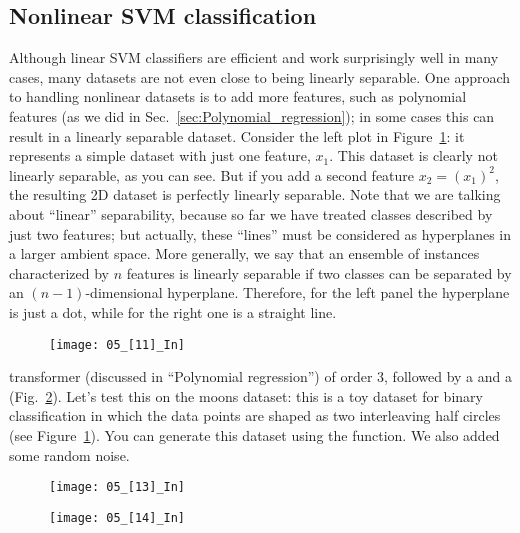 \subsection{Nonlinear SVM classification}
Although linear SVM classifiers are efficient and work surprisingly well in many cases, many datasets are not even close to being linearly separable. One approach to handling nonlinear datasets is to add more features, such as polynomial features (as we did in Sec.~\ref{sec:Polynomial_regression}); in some cases this can result in a linearly separable dataset. Consider the left plot in Figure~\ref{05_[11]_In}: it represents a simple dataset with just one feature, $x_1$. This dataset is clearly not linearly separable, as you can see. But if you add a second feature $x_2={(x_1)}^2$, the resulting 2D dataset is perfectly linearly separable. Note that we are talking about ``linear'' separability, because so far we have treated classes described by just two features; but actually, these ``lines'' must be considered as hyperplanes in a larger ambient space. More generally, we say that an ensemble of instances characterized by $n$ features is linearly separable if two classes can be separated by an $(n-1)$-dimensional hyperplane. Therefore, for the left panel the hyperplane is just a dot, while for the right one is a straight line.
\begin{figure}[h!t]
\centering
\texttt{[image: 05\_[11]\_In]}
\caption{}\label{05_[11]_In}
\end{figure}

  transformer (discussed in ``Polynomial regression'') of order 3, followed by a  and a  (Fig.~\ref{05_[13]_In}). Let's test this on the moons dataset: this is a toy dataset for binary classification in which the data points are shaped as two interleaving half circles (see Figure~\ref{05_[11]_In}). You can generate this dataset using the  function. We also added some random noise.
\begin{figure}[h!t]
\centering
\texttt{[image: 05\_[13]\_In]}
\caption{}\label{05_[13]_In}
\end{figure}
\begin{figure}[h!t]
\centering
\texttt{[image: 05\_[14]\_In]}
\caption{}\label{05_[14]_In}
\end{figure}
